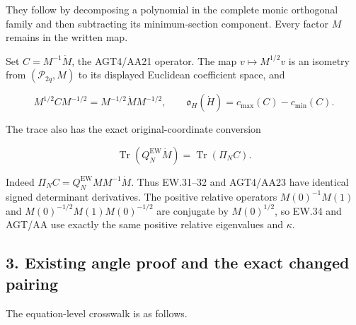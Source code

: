 They follow by decomposing a polynomial in the complete monic orthogonal family and then subtracting its minimum-section component. Every factor \(M\) remains in the written map.

Set \(C=M^{-1}\dot M\), the AGT4/AA21 operator. The map \(v\mapsto M^{1/2}v\) is an isometry from \((\mathcal P_{2q},M)\) to its displayed Euclidean coefficient space, and

\[
M^{1/2}CM^{-1/2}=M^{-1/2}\dot M M^{-1/2},\qquad
\mathfrak o_H(\dot H)=c_{\max}(C)-c_{\min}(C).
\tag{EP8}
\]

The trace also has the exact original-coordinate conversion

\[
\operatorname{Tr}(Q_N^{\mathrm{EW}}\dot M)
=\operatorname{Tr}(\Pi_N C).
\tag{EP9}
\]

Indeed \(\Pi_N C=Q_N^{\mathrm{EW}}MM^{-1}\dot M\). Thus EW.31--32 and AGT4/AA23 have identical signed determinant derivatives. The positive relative operators \(M(0)^{-1}M(1)\) and \(M(0)^{-1/2}M(1)M(0)^{-1/2}\) are conjugate by \(M(0)^{1/2}\), so EW.34 and AGT/AA use exactly the same positive relative eigenvalues and \(\kappa\).

\subsection{3. Existing angle proof and the exact changed pairing}\label{GraphV2:existing-angle-proof-and-the-exact-changed-pairing}

The equation-level crosswalk is as follows.

